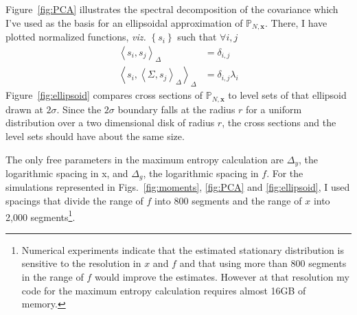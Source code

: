 \documentclass[]{article}
\newcommand{\field}[1]{\mathbb{#1}}
\newcommand\Polytope[1]{\field{P}_{#1}}
\newcommand\PolytopeN{\Polytope{N,\mathbf{x}}}
\newcommand\inner[2]{\left<#1,#2\right>}
\newcommand\logf{g}
\begin{document}
Figure~\ref{fig:PCA} illustrates the spectral decomposition of the
covariance which I've used as the basis for an ellipsoidal
approximation of $\PolytopeN$.  There, I have plotted normalized
functions, \emph{viz.} $\left\{ s_i \right\}$ such that $\forall i,j$
\begin{align*}
  \inner{s_i}{s_j}_{\Delta} &= \delta_{i,j} \\
  \inner{s_i}{\inner{\Sigma}{s_j}_{\Delta}}_\Delta &= \delta_{i,j}
  \lambda_i
\end{align*}
Figure~\ref{fig:ellipsoid} compares cross sections of $\PolytopeN$ to
level sets of that ellipsoid drawn at $2\sigma$.  Since the $2\sigma$
boundary falls at the radius $r$ for a uniform distribution over a two
dimensional disk of radius $r$, the cross sections and the level sets
should have about the same size.

The only free parameters in the maximum entropy calculation are
$\Delta_y $, the logarithmic spacing in x, and $\Delta_\logf$, the
logarithmic spacing in $f$.  For the simulations represented in
Figs.~\ref{fig:moments}, \ref{fig:PCA} and \ref{fig:ellipsoid}, I used
spacings that divide the range of $f$ into 800 segments and the range
of $x$ into 2,000 segments\footnote{Numerical experiments indicate
  that the estimated stationary distribution is sensitive to the
  resolution in $x$ and $f$ and that using more than 800 segments in
  the range of $f$ would improve the estimates.  However at that
  resolution my code for the maximum entropy calculation requires
  almost 16GB of memory.}.

\begin{figure*}
  \centering
    \caption{A principal component analysis of $\Polytope{2000}$, a
      polytope defined by the constraints \eqref{eq:constraint}.  The
      eigenvalues $\lambda_i$ of the covariance appear in the upper
      plot.  The eigenfunctions corresponding to the five largest
      eigenvalues appear in the lower plot.}
  \label{fig:PCA}
\end{figure*}

\begin{figure*}
  \centering
  \caption{Cross sections of both an allowed polytope $\Polytope{2000}$
    and an approximating ellipsoid.  In each plot coefficients of a
    pair of basis functions appear.  The labels on the axes of each
    plot indicate the indices of the coefficients and basis functions.
    Given $\Sigma$, the covariance in the 2-d subspace of the two
    basis functions conditioned on all other coefficients, the
    equation $x^T \Sigma^{-1} x = 4$ defines the ellipse.}
  \label{fig:ellipsoid}
\end{figure*}
\end{document}
